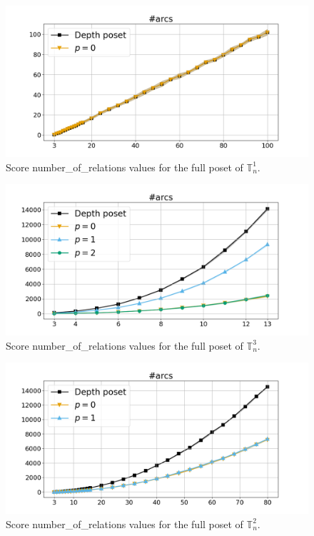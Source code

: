 \documentclass{article}
\begin{document}
    \begin{figure}[h!]
        \centering
        \hspace*{-0.24\textwidth}
        \includegraphics[width=1.4\textwidth]{pics/extended torus scores/score=number-of-relations, dim=1, object=full.png}
        \caption{Score number\_of\_relations values for the full poset of $\mathbb{T}_n^{1}$.}
        \label{fig:numberofrelations-full1}
    \end{figure}
    \begin{figure}[h!]
        \centering
        \hspace*{-0.24\textwidth}
        \includegraphics[width=1.4\textwidth]{pics/extended torus scores/score=number-of-relations, dim=3, object=full.png}
        \caption{Score number\_of\_relations values for the full poset of $\mathbb{T}_n^{3}$.}
        \label{fig:numberofrelations-full3}
    \end{figure}
    \begin{figure}[h!]
        \centering
        \hspace*{-0.24\textwidth}
        \includegraphics[width=1.4\textwidth]{pics/extended torus scores/score=number-of-relations, dim=2, object=full.png}
        \caption{Score number\_of\_relations values for the full poset of $\mathbb{T}_n^{2}$.}
        \label{fig:numberofrelations-full2}
    \end{figure}
\end{document}
